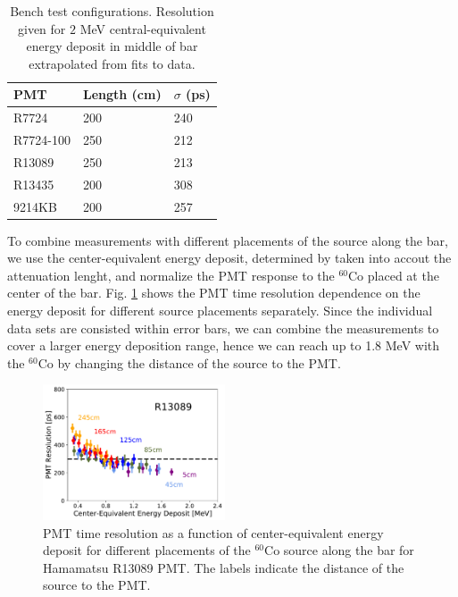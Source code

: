\documentclass[3p,final,twocolumn]{elsarticle}
\begin{document}
\begin{table}[t!]
	\caption{Bench test configurations. Resolution given for $2$ \si{\mega\electronvolt} central-equivalent energy deposit in middle of bar extrapolated from fits to data.}
\centering
	\begin{tabular}{ m{5em}   m{3em}   m{3em} }
		\hline
			PMT & Length (cm) & $\sigma$ (\si{\pico\second})\\
		\hline\hline
			R7724 &  200 &  240		\\
			R7724-100 & 250 & 212 		\\
			R13089 & 250 & 213			\\			
			R13435 & 200 & 308 			\\		
			9214KB & 200 & 257			\\
		\hline
	\end{tabular}
	\label{tab:tests}
\end{table}

To combine measurements with different placements of the source along the bar, we use the center-equivalent energy deposit, determined by taken into accout the attenuation lenght, and normalize the PMT response to the $^{60}$Co placed at the center of the bar. Fig. \ref{fig:test_stand_posdep} shows the PMT time resolution dependence on the energy deposit for different source placements separately. Since the individual data sets are consisted within error bars, we can combine the measurements to cover a larger energy deposition range, hence we can reach up to 1.8 \si{\mega\electronvolt} with the $^{60}$Co by changing the distance of the source to the PMT.
\begin{figure}[tb]
	\centering
		\includegraphics[width=0.48\textwidth]{pos-dep.pdf}
		\caption{PMT time resolution as a function of center-equivalent energy deposit for different placements of the $^{60}$Co source along the bar for Hamamatsu R13089 PMT. The labels indicate the distance of the source to the PMT. }
	\label{fig:test_stand_posdep}
\end{figure}
\end{document}
